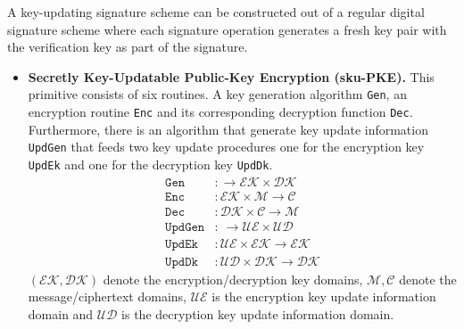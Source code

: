 \documentclass[11pt,a4paper,twoside,openright,bibliography=totoc]{scrbook}
\begin{document}
A key-updating signature scheme can be constructed out of a regular
digital signature scheme where each signature operation generates
a fresh key pair with the verification key as part of the signature.

\begin{itemize}
\item \textbf{Secretly Key-Updatable Public-Key Encryption (sku-PKE).} This
  primitive consists of six routines. A key generation algorithm \texttt{Gen},
  an encryption routine \texttt{Enc} and its corresponding decryption function
  \texttt{Dec}. Furthermore, there is an algorithm that generate key update
  information \texttt{UpdGen} that feeds two key update procedures
  one for the encryption key \texttt{UpdEk} and one for the
  decryption key \texttt{UpdDk}.
  \begin{align*}
    \texttt{Gen} & : \rightarrow \mathcal{EK} \times \mathcal{DK} \\
    \texttt{Enc} & : \mathcal{EK} \times \mathcal{M} \rightarrow \mathcal{C} \\
    \texttt{Dec} & : \mathcal{DK} \times \mathcal{C} \rightarrow \mathcal{M} \\
    \texttt{UpdGen} & : \ \rightarrow \mathcal{UE} \times \mathcal{UD} \\
    \texttt{UpdEk} & : \mathcal{UE} \times \mathcal{EK} \rightarrow \mathcal{EK} \\
    \texttt{UpdDk} & :  \mathcal{UD} \times \mathcal{DK} \rightarrow \mathcal{DK}
  \end{align*}
  $(\mathcal{EK},\mathcal{DK})$ denote the encryption/decryption key domains,
  $\mathcal{M},\mathcal{C}$ denote the message/ciphertext domains, $\mathcal{UE}$
  is the encryption key update information domain and $\mathcal{UD}$ is the
  decryption key update information domain.
\end{itemize}
\end{document}
